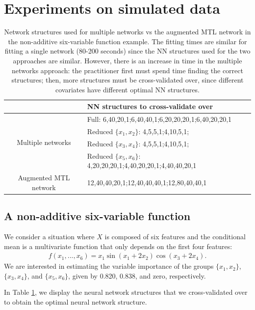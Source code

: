 \documentclass{article}
\begin{document}
\section{Experiments on simulated data}\label{sec:sims}

\begin{table}
\centering
\begin{tabular}{c|l}
& NN structures to cross-validate over\\
\toprule
\multirow{4}{*}{Multiple networks} & Full: 6,40,20,1;6,40,40,1;6,20,20,20,1;6,40,20,20,1 \\
& Reduced $\{x_1, x_2\}$: 4,5,5,1;4,10,5,1; \\
& Reduced $\{x_3, x_4\}$: 4,5,5,1;4,10,5,1; \\
& Reduced $\{x_5, x_6\}$: 4,20,20,20,1;4,40,20,20,1;4,40,40,20,1\\
\hline
Augmented MTL network & 12,40,40,20,1;12,40,40,40,1;12,80,40,40,1 \\
\end{tabular}
\caption{
	Network structures used for multiple networks vs the augmented MTL network in the non-additive six-variable function example.
	The fitting times are similar for fitting a single network (80-200 seconds) since the NN structures used for the two approaches are similar.
	However, there is an increase in time in the multiple networks approach: the practitioner first must spend time finding the correct structures; then, more structures must be cross-validated over, since different covariates have different optimal NN structures.
}
\label{table:timing_experiments}
\end{table}

\subsection{A non-additive six-variable function}

We consider a situation where $X$ is composed of six features and the conditional mean is a multivariate function that only depends on the first four features:
\begin{align}
f(x_1, ..., x_6) = x_1 \sin(x_1 + 2x_2) \cos(x_3 + 2x_4).
\label{eq:six_func}
\end{align}
We are interested in estimating the variable importance of the groups $\{x_1, x_2\}$, $\{x_3, x_4\}$, and $\{x_5,x_6\}$, given by 0.820, 0.838, and zero, respectively.

In Table \ref{table:timing_experiments}, we display the neural network structures that we cross-validated over to obtain the optimal neural network structure.
\end{document}
